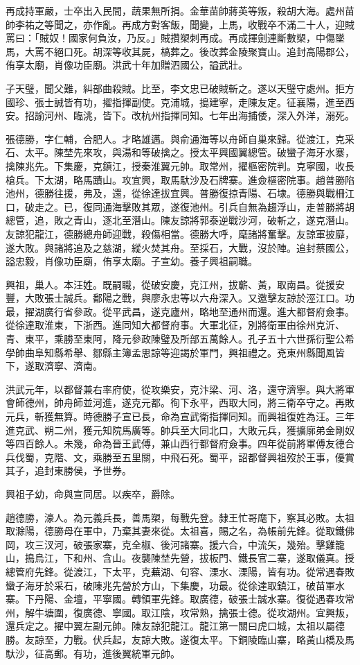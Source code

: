 \begin{pinyinscope}
再成持軍嚴，士卒出入民間，蔬果無所捐。金華苗帥蔣英等叛，殺胡大海。處州苗帥李祐之等聞之，亦作亂。再成方對客飯，聞變，上馬，收戰卒不滿二十人，迎賊罵曰：「賊奴！國家何負汝，乃反。」賊攢槊刺再成。再成揮劍連斷數槊，中傷墜馬，大罵不絕口死。胡深等收其屍，槁葬之。後改葬金陵聚寶山。追封高陽郡公，侑享太廟，肖像功臣廟。洪武十年加贈泗國公，謚武壯。

子天璧，聞父難，糾部曲殺賊。比至，李文忠已破賊斬之。遂以天璧守處州。拒方國珍、張士誠皆有功，擢指揮副使。克浦城，搗建寧，走陳友定。征襄陽，進至西安。招諭河州、臨洮，皆下。改杭州指揮同知。七年出海捕倭，深入外洋，溺死。

張德勝，字仁輔，合肥人。才略雄邁。與俞通海等以舟師自巢來歸。從渡江，克采石、太平。陳埜先來攻，與湯和等破擒之。授太平興國翼總管。破蠻子海牙水寨，擒陳兆先。下集慶，克鎮江，授秦淮翼元帥。取常州，擢樞密院判。克寧國，收長槍兵。下太湖，略馬蹟山。攻宜興，取馬馱沙及石牌寨。進僉樞密院事。趙普勝陷池州，德勝往援，弗及，還，從徐達拔宜興。普勝復掠青陽、石埭。德勝與戰柵江口，破走之。已，復同通海擊敗其眾，遂復池州。引兵自無為趨浮山，走普勝將胡總管，追，敗之青山，逐北至潛山。陳友諒將郭泰逆戰沙河，破斬之，遂克潛山。友諒犯龍江，德勝總舟師迎戰，殺傷相當。德勝大呼，麾諸將奮擊。友諒軍披靡，遂大敗。與諸將追及之慈湖，縱火焚其舟。至採石，大戰，沒於陣。追封蔡國公，謚忠毅，肖像功臣廟，侑享太廟。子宣幼。養子興祖嗣職。

興祖，巢人。本汪姓。既嗣職，從破安慶，克江州，拔蘄、黃，取南昌。從援安豐，大敗張士誠兵。鄱陽之戰，與廖永忠等以六舟深入。又邀擊友諒於涇江口。功最，擢湖廣行省參政。從平武昌，遂克廬州，略地至通州而還。進大都督府僉事。從徐達取淮東，下浙西。進同知大都督府事。大軍北征，別將衛軍由徐州克沂、青、東平，乘勝至東阿，降元參政陳璧及所部五萬餘人。孔子五十六世孫衍聖公希學帥曲阜知縣希舉、鄒縣主簿孟思諒等迎謁於軍門，興祖禮之。兗東州縣聞風皆下，遂取濟寧、濟南。

洪武元年，以都督兼右率府使，從攻樂安，克汴梁、河、洛，還守濟寧。與大將軍會師德州，帥舟師並河進，遂克元都。徇下永平，西取大同，將三衛卒守之。再敗元兵，斬獲無算。時德勝子宣已長，命為宣武衛指揮同知。而興祖復姓為汪。三年進克武、朔二州，獲元知院馬廣等。帥兵至大同北口，大敗元兵，獲擴廓弟金剛奴等四百餘人。未幾，命為晉王武傅，兼山西行都督府僉事。四年從前將軍傅友德合兵伐蜀，克階、文，乘勝至五里關，中飛石死。蜀平，詔都督興祖歿於王事，優賞其子，追封東勝侯，予世券。

興祖子幼，命與宣同居。以疾卒，爵除。

趙德勝，濠人。為元義兵長，善馬槊，每戰先登。隸王忙哥麾下，察其必敗。太祖取滁陽，德勝母在軍中，乃棄其妻來從。太祖喜，賜之名，為帳前先鋒。從取鐵佛岡，攻三汊河，破張家寨，克全椒、後河諸寨。援六合，中流矢，幾殆。擊雞籠山，搗烏江，下和州、含山。夜襲陳埜先營，拔板門、鐵長官二寨，遂取儀真。授總管府先鋒。從渡江，下太平，克蕪湖、句容、溧水、溧陽，皆有功。從常遇春敗蠻子海牙於采石，破陳兆先營於方山，下集慶，功最。從徐達取鎮江，破苗軍水寨。下丹陽、金壇，平寧國。轉領軍先鋒。取廣德，破張士誠水寨。復從遇春攻常州，解牛塘圍，復廣德、寧國。取江陰，攻常熟，擒張士德。從攻湖州。宜興叛，還兵定之。擢中翼左副元帥。陳友諒犯龍江。龍江第一關曰虎口城，太祖以屬德勝。友諒至，力戰。伏兵起，友諒大敗。遂復太平。下銅陵臨山寨，略黃山橋及馬馱沙，征高郵。有功，進後翼統軍元帥。


\end{pinyinscope}
